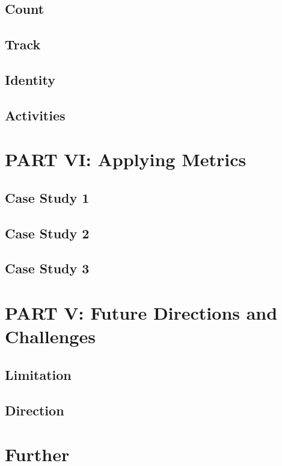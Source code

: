 \documentclass[
  letterpaper,
]{scrbook}
\begin{document}
\hypertarget{count}{%
\chapter{Count}\label{count}}

\hypertarget{track}{%
\chapter{Track}\label{track}}

\hypertarget{identity}{%
\chapter{Identity}\label{identity}}

\hypertarget{activities}{%
\chapter{Activities}\label{activities}}

\part{PART VI: Applying Metrics}

\hypertarget{case-study-1}{%
\chapter{Case Study 1}\label{case-study-1}}

\hypertarget{case-study-2}{%
\chapter{Case Study 2}\label{case-study-2}}

\hypertarget{case-study-3}{%
\chapter{Case Study 3}\label{case-study-3}}

\part{PART V: Future Directions and Challenges}

\hypertarget{limitation}{%
\chapter{Limitation}\label{limitation}}

\hypertarget{direction}{%
\chapter{Direction}\label{direction}}

\part{Further}


\backmatter
\end{document}
